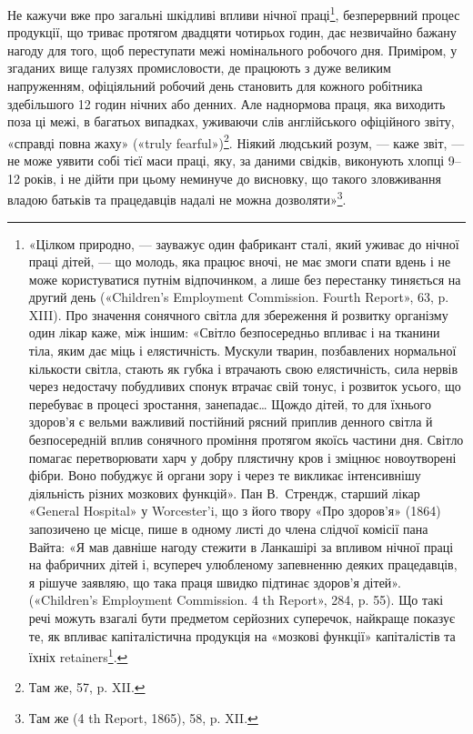 Не кажучи вже про загальні шкідливі впливи нічної праці\footnote{
«Цілком природно, — зауважує один фабрикант сталі, який
уживає до нічної праці дітей, — що молодь, яка працює вночі, не має
змоги спати вдень і не може користуватися путнім відпочинком, а лише
без перестанку тиняється на другий день («Children’s Employment Commission.
Fourth Report», 63, p. XIII). Про значення сонячного світла для
збереження й розвитку організму один лікар каже, між іншим: «Світло
безпосередньо впливає і на тканини тіла, яким дає міць і елястичність.
Мускули тварин, позбавлених нормальної кількости світла, стають як губка
і втрачають свою елястичність, сила нервів через недостачу побудливих
спонук втрачає свій тонус, і розвиток усього, що перебуває в процесі
зростання, занепадає\dots{} Щождо дітей, то для їхнього здоров’я є вельми
важливий постійний рясний приплив денного світла й безпосередній вплив
сонячного проміння протягом якоїсь частини дня. Світло помагає перетворювати
харч у добру плястичну кров і зміцнює новоутворені фібри. Воно
побуджує й органи зору і через те викликає інтенсивнішу діяльність різних
мозкових функцій». Пан В.~Стрендж, старший лікар «General Hospital»
у Worcester’i, що з його твору «Про здоров’я» (1864) запозичено це
місце, пише в одному листі до члена слідчої комісії пана Вайта: «Я мав
давніше нагоду стежити в Ланкашірі за впливом нічної праці на фабричних
дітей і, всупереч улюбленому запевненню деяких працедавців, я
рішуче заявляю, що така праця швидко підтинає здоров’я дітей». («Children’s
Employment Commission. 4 th Report», 284, p. 55). Що такі речі
можуть взагалі бути предметом серйозних суперечок, найкраще показує
те, як впливає капіталістична продукція на «мозкові функції» капіталістів
та їхніх retainers\footnote*{
— прихильників. \emph{Ред.}
}.
},
безперервний процес продукції, що триває протягом двадцяти чотирьох
годин, дає незвичайно бажану нагоду для того, щоб переступати
межі номінального робочого дня. Приміром, у згаданих
вище галузях промисловости, де працюють з дуже великим напруженням,
офіціяльний робочий день становить для кожного робітника
здебільшого 12 годин нічних або денних. Але наднормова
праця, яка виходить поза ці межі, в багатьох випадках, уживаючи
слів англійського офіційного звіту, «справді повна жаху»
(«truly fearful»)\footnote{
Там же, 57, p. XII.
}. Ніякий людський розум, — каже звіт, — не
може уявити собі тієї маси праці, яку, за даними свідків, виконують
хлопці 9--12 років, і не дійти при цьому неминуче
до висновку, що такого зловживання владою батьків та працедавців
надалі не можна дозволяти»\footnote{
Там же (4 th Report, 1865), 58, p. XII.
}.

